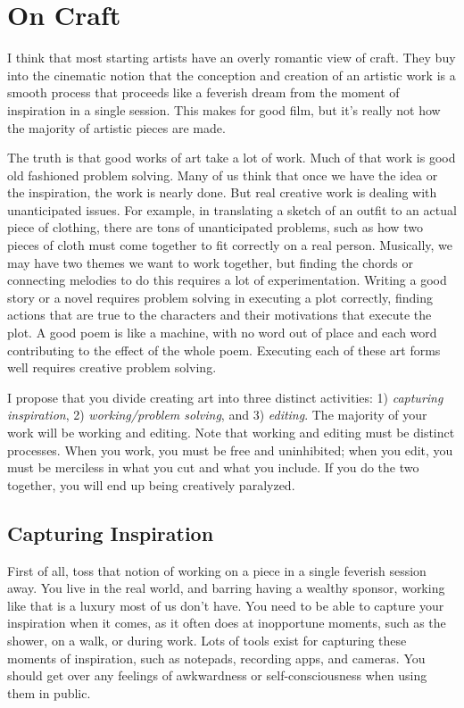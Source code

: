 \documentclass[
]{book}
\begin{document}
\hypertarget{on-craft}{%
\chapter{On Craft}\label{on-craft}}

I think that most starting artists have an overly romantic view of craft. They buy into the cinematic notion that the conception and creation of an artistic work is a smooth process that proceeds like a feverish dream from the moment of inspiration in a single session. This makes for good film, but it's really not how the majority of artistic pieces are made.

The truth is that good works of art take a lot of work. Much of that work is good old fashioned problem solving. Many of us think that once we have the idea or the inspiration, the work is nearly done. But real creative work is dealing with unanticipated issues. For example, in translating a sketch of an outfit to an actual piece of clothing, there are tons of unanticipated problems, such as how two pieces of cloth must come together to fit correctly on a real person. Musically, we may have two themes we want to work together, but finding the chords or connecting melodies to do this requires a lot of experimentation. Writing a good story or a novel requires problem solving in executing a plot correctly, finding actions that are true to the characters and their motivations that execute the plot. A good poem is like a machine, with no word out of place and each word contributing to the effect of the whole poem. Executing each of these art forms well requires creative problem solving.

I propose that you divide creating art into three distinct activities: 1) \emph{capturing inspiration}, 2) \emph{working/problem solving}, and 3) \emph{editing}. The majority of your work will be working and editing. Note that working and editing must be distinct processes. When you work, you must be free and uninhibited; when you edit, you must be merciless in what you cut and what you include. If you do the two together, you will end up being creatively paralyzed.

\hypertarget{capturing-inspiration}{%
\section{Capturing Inspiration}\label{capturing-inspiration}}

First of all, toss that notion of working on a piece in a single feverish session away. You live in the real world, and barring having a wealthy sponsor, working like that is a luxury most of us don't have. You need to be able to capture your inspiration when it comes, as it often does at inopportune moments, such as the shower, on a walk, or during work. Lots of tools exist for capturing these moments of inspiration, such as notepads, recording apps, and cameras. You should get over any feelings of awkwardness or self-consciousness when using them in public.
\end{document}
